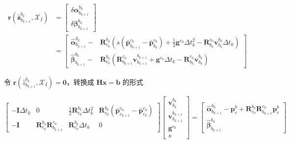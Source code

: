 \documentclass[12pt,a4paper]{article}
\begin{document}
\begin{equation}
\begin{aligned}
\mathbf{r}(\hat{\mathbf{z}}^{b_{k}}_{b_{k+1}}, \mathcal{X}_I) 
&=
\begin{bmatrix}
\delta \boldsymbol{\alpha}^{b_{k}}_{b_{k+1}} \\
\delta \boldsymbol{\beta}^{b_{k}}_{b_{k+1}}
\end{bmatrix} \\ 
&=
\begin{bmatrix}
\hat{\boldsymbol{\alpha}}^{b_{k}}_{b_{k+1}} -& 
\mathbf{R}^{b_{k}}_{c_{0}}
\left(
s(\bar{\mathbf{p}}^{c_{0}}_{b_{k+1}} - \bar{\mathbf{p}}^{c_{0}}_{b_{k}}) +
\frac{1}{2}\mathbf{g}^{c_{0}} \Delta t_{k}^{2} -
\mathbf{R}^{c_0}_{b_k} \mathbf{v}^{b_k}_{b_{k}} \Delta t_{k} 
\right) \\
\hat{\boldsymbol{\beta}}^{b_{k}}_{b_{k+1}} -&
\mathbf{R}^{b_{k}}_{c_{0}}
\left(
\mathbf{R}^{c_0}_{b_{k+1}} \mathbf{v}^{b_{k+1}}_{b_{k+1}} +
\mathbf{g}^{c_{0}}\Delta t_{k} - \mathbf{R}^{c_0}_{b_k} \mathbf{v}^{b_k}_{b_{k}}
\right)
\end{bmatrix}
\end{aligned}
\end{equation}

令 $\mathbf{r}(\hat{z}_{b_{k+1}}^{b_{k}}, \mathcal{X}_I)=\mathbf{0}$，转换成 $\mathbf{Hx}=\mathbf{b}$ 的形式

\begin{equation}
\label{equ:init_vgs}
\begin{bmatrix}
-\mathbf{I} \Delta t_{k} & 0 & \frac{1}{2} \mathbf{R}^{b_{k}}_{c_{0}} \Delta t_{k}^{2} &
\mathbf{R}^{b_{k}}_{c_{0}} (\bar{\mathbf{p}}^{c_{0}}_{c_{k+1}} - \bar{\mathbf{p}}^{c_{0}}_{c_{k}}) \\
-\mathbf{I} & \mathbf{R}^{b_{k}}_{c_{0}} \mathbf{R}^{c_0}_{b_{k+1}} & \mathbf{R}^{b_{k}}_{c_{0}}\Delta t_{k} & 0
\end{bmatrix}
\begin{bmatrix}
\mathbf{v}^{b_{k}}_{b_{k}}\\
\mathbf{v}^{b_{k+1}}_{b_{k+1}}\\
\mathbf{g}^{c_{0}}\\
s
\end{bmatrix} 
=
\begin{bmatrix}
\boldsymbol{\hat{\alpha}}^{b_{k}}_{b_{k+1}} - \mathbf{p}_c^b + \mathbf{R}^{b_{k}}_{c_{0}} \mathbf{R}^{c_0}_{b_{k+1}} \mathbf{p}_c^b \\
\boldsymbol{\hat{\beta}}^{b_{k}}_{b_{k+1}}
\end{bmatrix}
\end{equation}
\end{document}
